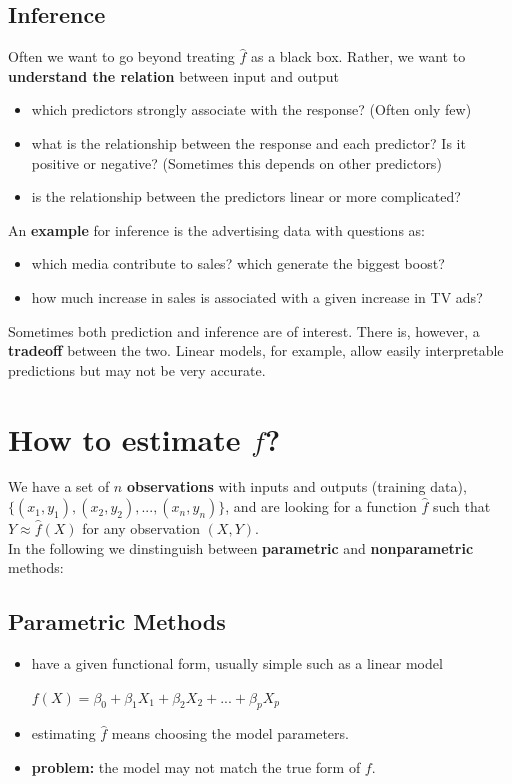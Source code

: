 		\subsection{Inference}
			Often we want to go beyond treating $\hat{f}$ as a black box.
			Rather, we want to \textbf{understand the relation} between input and output
			\begin{itemize}
				\item which predictors strongly associate with the response? (Often only few)
				\item what is the relationship between the response and each predictor? Is it positive or negative? (Sometimes this depends on other predictors)
				\item is the relationship between the predictors linear or more complicated?
			\end{itemize}
			An \textbf{example} for inference is the advertising data with questions as:
			\begin{itemize}
				\item which media contribute to sales? which generate the biggest boost?
				\item how much increase in sales is associated with a given increase in TV ads?
			\end{itemize}
			Sometimes both prediction and inference are of interest.
			There is, however, a \textbf{tradeoff} between the two. Linear models, for example, allow easily interpretable predictions but may not be very accurate.
	
	\section{How to estimate $f$?}
		We have a set of $n$ \textbf{observations} with inputs and outputs (training data), $\{(x_1,y_1),(x_2,y_2),...,(x_n,y_n)\}$,
		and are looking for a function $\hat{f}$ such that $Y \approx \hat{f}(X)$ for any observation $(X,Y)$.\\
		In the following we dinstinguish between \textbf{parametric} and \textbf{nonparametric} methods:
		
		\subsection{Parametric Methods}
			\begin{itemize}
				\item have a given functional form, usually simple such as a linear model
					\begin{center}
						$f(X) = \beta_0 + \beta_1X_1 + \beta_2X_2 + ... + \beta_pX_p$
					\end{center}
				\item estimating $\hat{f}$ means choosing the model parameters.
				\item \textbf{problem:} the model may not match the true form of $f$.
			\end{itemize}
		
